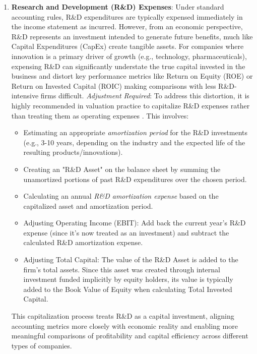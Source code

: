 \begin{enumerate}
    \item \textbf{Research and Development (R\&D) Expenses}: Under standard accounting rules, R\&D expenditures are typically expensed immediately in the income statement as incurred. However, from an economic perspective, R\&D represents an investment intended to generate future benefits, much like Capital Expenditures (CapEx) create tangible assets. For companies where innovation is a primary driver of growth (e.g., technology, pharmaceuticals), expensing R\&D can significantly understate the true capital invested in the business and distort key performance metrics like Return on Equity (ROE) or Return on Invested Capital (ROIC) making comparisons with less R\&D-intensive firms difficult.
          \textit{Adjustment Required}: To address this distortion, it is highly recommended in valuation practice to capitalize R\&D expenses rather than treating them as operating expenses \parencite{damodaran_rd, koller2020valuation}. This involves:
          \begin{itemize}
              \item Estimating an appropriate \textit{amortization period} for the R\&D investments (e.g., 3-10 years, depending on the industry and the expected life of the resulting products/innovations).
              \item Creating an "R\&D Asset" on the balance sheet by summing the unamortized portions of past R\&D expenditures over the chosen period.
              \item Calculating an annual \textit{R\&D amortization expense} based on the capitalized asset and amortization period.
              \item Adjusting Operating Income (EBIT): Add back the current year's R\&D expense (since it's now treated as an investment) and subtract the calculated R\&D amortization expense.
              \item Adjusting Total Capital: The value of the R\&D Asset is added to the firm's total assets. Since this asset was created through internal investment funded implicitly by equity holders, its value is typically added to the Book Value of Equity when calculating Total Invested Capital.
          \end{itemize}
          This capitalization process treats R\&D as a capital investment, aligning accounting metrics more closely with economic reality and enabling more meaningful comparisons of profitability and capital efficiency across different types of companies.
\end{enumerate}

